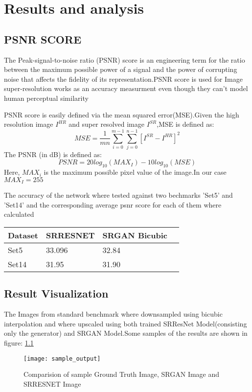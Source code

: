 \chapter{Results and analysis}

\section{PSNR SCORE}
The Peak-signal-to-noise ratio (PSNR) score is an engineering term for the ratio between the maximum possible power of a signal and the power of corrupting noise that affects the fidelity of its representation.PSNR score is used for Image super-resolution works as an accuracy measurment even though they can't model human perceptual similarity

PSNR score is easily defined via the mean squared error(MSE).Given the high resolution image $I^{HR}$ and super resolved image $I^{SR}$,MSE is defined as:
\begin{equation}
MSE = \frac{1}{mn}\sum_{i=0}^{m-1}\sum_{j=0}^{n-1}{[I^{SR} - I^{HR}]}^2
\end{equation}
The PSNR (in dB) is defined as:
\begin{equation}
PSNR = 20 log_{10}(MAX_I) - 10 log_{10}(MSE)
\end{equation}
Here, $MAX_i$ is the maximum possible pixel value of the image.In our case $MAX_I = 255$ 

The accuracy of the network where tested against two bechmarks 'Set5' and 'Set14' and the corresponding average psnr score for each of them where calculated
\begin{center}
\begin{tabular}{|m{3cm} | m{3cm} | m{3cm} | m{3cm} |}
 \hline
 \textbf{Dataset} & \textbf{SRRESNET} & \textbf{SRGAN} \textbf{Bicubic}\\
 \hline
 Set5 &33.096&32.84 \\
\hline
 Set14 &31.95 &31.90 \\
 \hline
\end{tabular}
\end{center}
\section{Result Visualization}
The Images from standard benchmark where downsampled using bicubic interpolation and where upscaled using both trained SRResNet Model(consisting only the generator) and SRGAN Model.Some samples of the results are shown in figure: \ref{fig:sampleoutput} 
\begin{figure}[h]
\centering
\texttt{[image: sample\_output]}
\caption{Comparision of sample Ground Truth Image, SRGAN Image and SRRESNET Image}
\label{fig:sampleoutput}
\end{figure}

